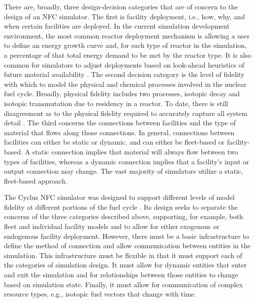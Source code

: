 There are, broadly, three design-decision categories that are of concern to the
design of an NFC simulator. The first is facility deployment, i.e., how, why,
and when certain facilities are deployed. In the current simulation development
environment, the most common reactor deployment mechanism is allowing a user to
define an energy growth curve and, for each type of reactor in the simulation, a
percentage of that total energy demand to be met by the reactor type. It is also
common for simulators to adjust deployments based on look-ahead heuristics of
future material availability \cite{schweitzer_improved_2008,
  van_den_durpel_daness_2009}. The second decision category is the level of
fidelity with which to model the physical and chemical processes involved in the
nuclear fuel cycle. Broadly, physical fidelity includes two processes, isotopic
decay and isotopic transmutation due to residency in a reactor. To date, there
is still disagreement as to the physical fidelity required to accurately capture
all system detail \cite{guerin_impact_2009}. The third concerns the connections
between facilities and the type of material that flows along those
connections. In general, connections between facilities can either be static or
dynamic, and can either be fleet-based or facility-based. A static connection
implies that material will always flow between two types of facilities, whereas
a dynamic connection implies that a facility's input or output connection may
change. The vast majority of simulators utilize a static, fleet-based approach.

The Cyclus NFC simulator was designed to support different levels of model
fidelity at different portions of the fuel cycle \cite{huff_cyclus_2015}. Its
design seeks to separate the concerns of the three categories described above,
supporting, for example, both fleet and individual facility models and to allow
for either exogenous or endogenous facility deployment. However, there must be a
basic infrastructure to define the method of connection and allow communication
between entities in the simulation. This infrastructure must be flexible in that
it must support each of the categories of simulation design. It must allow for
dynamic entities that enter and exit the simulation and for relationships
between those entities to change based on simulation state. Finally, it must
allow for communication of complex resource types, e.g., isotopic fuel vectors
that change with time. 

